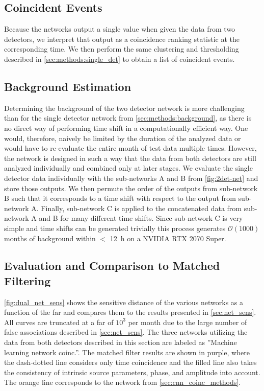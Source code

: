 \subsection{Coincident Events}
Because the networks output a single value when given the data from two detectors, we interpret that output as a coincidence ranking statistic at the corresponding time. We then perform the same clustering and thresholding described in \autoref{sec:methods:single_det} to obtain a list of coincident events.

\subsection{Background Estimation}
Determining the background of the two detector network is more challenging than for the single detector network from \autoref{sec:methods:background}, as there is no direct way of performing time shift in a computationally efficient way. One would, therefore, naively be limited by the duration of the analyzed data or would have to re-evaluate the entire month of test data multiple times. However, the network is designed in such a way that the data from both detectors are still analyzed individually and combined only at later stages. We evaluate the single detector data individually with the sub-networks A and B from \autoref{fig:2det-net} and store those outputs. We then permute the order of the outputs from sub-network B such that it corresponds to a time shift with respect to the output from sub-network A. Finally, sub-network C is applied to the concatenated data from sub-network A and B for many different time shifts. Since sub-network C is very simple and time shifts can be generated trivially this process generates $\mathcal{O}\left(1000\right)$ months of background within $<$ \SI{12}{\hour} on a NVIDIA RTX 2070 Super.

\subsection{Evaluation and Comparison to Matched Filtering}
\autoref{fig:dual_net_sens} shows the sensitive distance of the various networks as a function of the \acrshort{far} and compares them to the results presented in \autoref{sec:net_sens}. All curves are truncated at a \acrshort{far} of $10^3$ per month due to the large number of false associations described in \autoref{sec:net_sens}. The three networks utilizing the data from both detectors described in this section are labeled as ''Machine learning network coinc.''. The matched filter results are shown in purple, where the dash-dotted line considers only time coincidence and the filled line also takes the consistency of intrinsic source parameters, phase, and amplitude into account. The orange line corresponds to the network from \autoref{sec:cnn_coinc_methods}.

